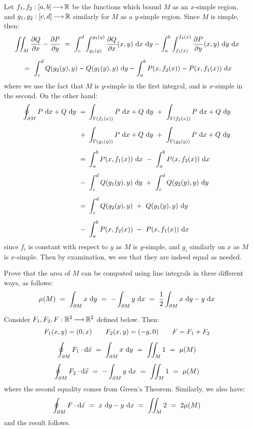 \begin{soln}
    Let $ f_{1}, f_{2}: [a,b] \operatorname{\longrightarrow} \mathbb{R} $ be the functions which bound $ M $
    as an $ x $-simple region, and $ g_{1}, g_{2}: [c,d] \operatorname{\longrightarrow} \mathbb{R} $ similarly
    for $ M $ as a $ y $-simple region. \vsp
    Since $ M $ is simple, then:
    \begin{gather*}
        \iint_{M}\frac{\p Q}{\p x} - \frac{\p P}{\p y} \ = \
        \int_{c}^{d}\int_{g_{1}(y)}^{g_{2}(y)}
        \frac{\p Q}{\p x}(x, y)\di x\di y -
        \int_{a}^{b}\int_{f_{1}(x)}^{f_{2}(x)}
        \frac{\p P}{\p y} (x,y)\di y\di x \vsp
        \ = \ \int_{c}^{d}Q(g_{2}(y), y) - Q(g_{1}(y), y)\di y
        - \int_{a}^{b}P(x, f_{2}(x)) - P(x, f_{1}(x))\di x
    \end{gather*}
    where we use the fact that $ M $ is $ y $-simple in the first integral, and
    is $ x $-simple in the second. On the other hand:
    \begin{align*}
        \oint_{\p M}P\di x+Q\di y
        \ = \ & \int_{\Gamma(f_{1}(x))}P\di x+Q\di y
        \ + \ \int_{\Gamma(f_{2}(x))}P\di x+Q\di y \vsp
        \ + \ & \int_{\Gamma(g_{1}(y))}P\di x+Q\di y
        \ + \ \int_{\Gamma(g_{2}(y))}P\di x+Q\di y \vsp
        \ = \ & \int_{a}^{b}P(x, f_{1}(x))\di x
        \ - \ \int_{a}^{b}P(x,f_{2}(x))\di x \vsp
        \ - \ & \int_{c}^{d}Q(g_{1}(y),y)\di y
        \ + \ \int_{c}^{d}Q(g_{2}(y), y)\di y \vsp
        \ = \ & \int_{c}^{d}Q(g_{2}(y),y) \ + \ Q(g_{1}(y),y)\di y \vsp
        \ - \ & \int_{a}^{b}P(x,f_{2}(x)) \ - \ P(x,f_{1}(x))\di x
    \end{align*}
    since $ f_{i} $ is constant with respect to $ y $ as $ M $ is $ y $-simple,
    and $ g_{i} $ similarly on $ x $ as $ M $ is $ x $-simple.
    Then by examination, we see that they are indeed equal as needed.
\end{soln}

\begin{qu}[num=45.2]
    Prove that the area of $ M $ can be computed using line integrals in three
    different ways, as follows:
    \begin{equation*}
        \mu(M) \ = \ \int_{\partial M}x\textrm{ d} y \ = \ -\int_{\partial M}y\textrm{ d} x
        \ = \ \frac{1}{2} \int_{\partial M} x\textrm{ d} y - y\textrm{ d} x
    \end{equation*}
\end{qu}

\begin{soln}
    Consider $ F_{1}, F_{2}, F: \mathbb{R}^{2} \operatorname{\longrightarrow} \mathbb{R}^{2} $ defined below. Then:
    \begin{gather*}
        F_{1}(x,y) = (0,x) \qquad F_{2}(x,y) = (-y,0) \qquad F = F_{1}+F_{2} \vsp
        \oint_{\p M}F_{1}\cdot\d\vec{x} \ = \ \int_{\p M}x\di y \ = \
        \iint_{M}1 \ = \ \mu(M) \vsp
        \oint_{\p M}F_{2}\cdot\d\vec{x} \ = \ -\int_{\p M}y\di x \ = \
        \iint_{M}1 \ = \ \mu(M)
    \end{gather*}
    where the second equality comes from Green's Theorem.
    Similarly, we also have:
    \begin{equation*}
        \oint_{\p M}F\cdot\d\vec{x} \ = \ x\di y - y\di x \ = \
        \iint_{M}2 \ = \ 2\mu(M)
    \end{equation*}
    and the result follows.
\end{soln}

